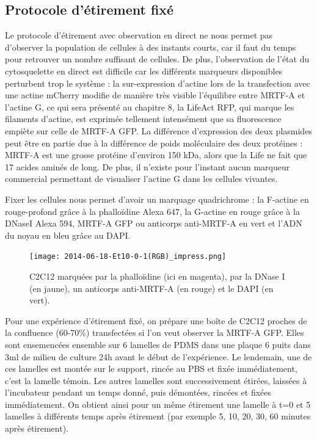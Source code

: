 	
	\subsection{Protocole d'étirement fixé}
	
	Le protocole d'étirement avec observation en direct ne nous permet pas d'observer la population de cellules à des instants courts, car il faut du temps pour retrouver un nombre suffisant de cellules. De plus, l'observation de l'état du cytosquelette en direct est difficile car les différents marqueurs disponibles perturbent trop le système : la sur-expression d'actine lors de la transfection avec une actine mCherry modifie de manière très visible l'équilibre entre MRTF-A et l'actine G, ce qui sera présenté au chapitre 8, la LifeAct RFP, qui marque les filaments d'actine, est exprimée tellement intensément que sa fluorescence empiète sur celle de MRTF-A GFP. La différence d'expression des deux plasmides peut être en partie due à la différence de poids moléculaire des deux protéines : MRTF-A est une grosse protéine d'environ 150 kDa, alors que la Life ne fait que 17 acides aminés de long. De plus, il n'existe pour l'instant aucun marqueur commercial permettant de visualiser l'actine G dans les cellules vivantes. 
	
	Fixer les cellules nous permet d'avoir un marquage quadrichrome : la F-actine en rouge-profond grâce à la phalloïdine Alexa 647, la G-actine en rouge grâce à la DNaseI Alexa 594, MRTF-A GFP ou anticorps anti-MRTF-A en vert et l'ADN du noyau en bleu grâce au DAPI. 
	
	\begin{figure}
	\texttt{[image: 2014-06-18-Et10-0-1(RGB)\_impress.png]}
	\caption{C2C12 marquées par la phalloïdine (ici en magenta), par la DNase I (en jaune), un anticorps anti-MRTF-A (en rouge) et le DAPI (en vert).}
	\end{figure}
	
	Pour une expérience d'étirement fixé, on prépare une boîte de C2C12 proches de la confluence (60-70\%) transfectées si l'on veut observer la MRTF-A GFP. Elles sont ensemencées ensemble sur 6 lamelles de PDMS dans une plaque 6 puits dans 3ml de milieu de culture 24h avant le début de l'expérience. Le lendemain, une de ces lamelles est montée sur le support, rincée au PBS et fixée immédiatement, c'est la lamelle témoin. Les autres lamelles sont successivement étirées, laissées à l'incubateur pendant un temps donné, puis démontées, rincées et fixées immédiatement. On obtient ainsi pour un même étirement une lamelle à t=0 et 5 lamelles à différents temps après étirement (par exemple 5, 10, 20, 30, 60 minutes après étirement). 
	
